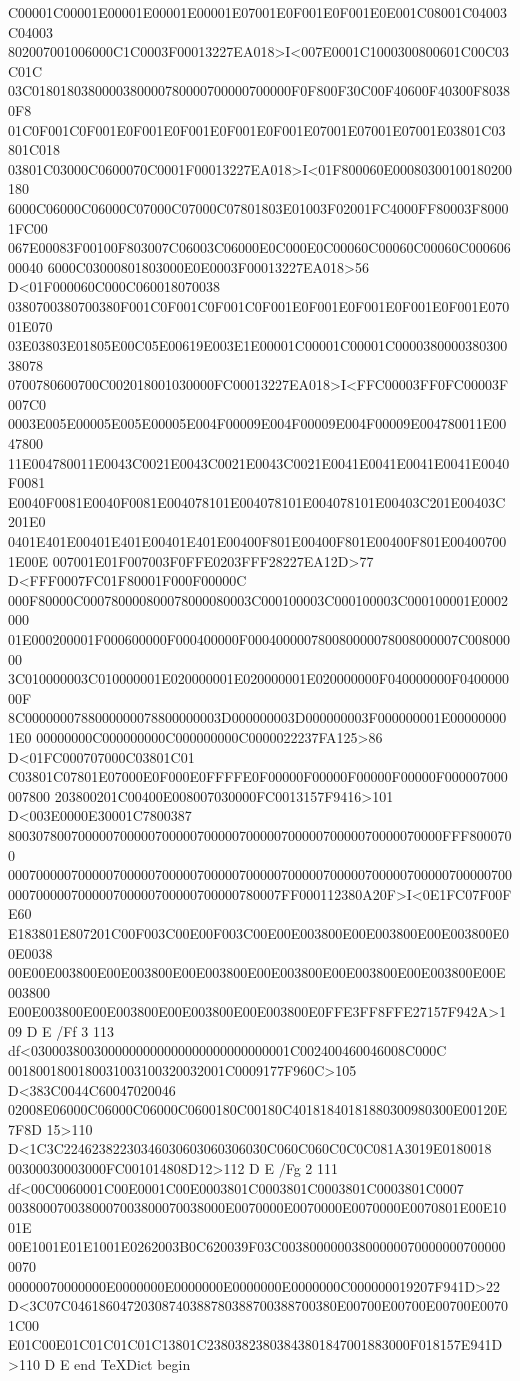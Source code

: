 C00001C00001E00001E00001E00001E07001E0F001E0F001E0E001C08001C04003C04003
802007001006000C1C0003F00013227EA018>I<007E0001C1000300800601C00C03C01C
03C0180180380000380000780000700000700000F0F800F30C00F40600F40300F80380F8
01C0F001C0F001E0F001E0F001E0F001E0F001E07001E07001E07001E03801C03801C018
03801C03000C0600070C0001F00013227EA018>I<01F800060E00080300100180200180
6000C06000C06000C07000C07000C07801803E01003F02001FC4000FF80003F80001FC00
067E00083F00100F803007C06003C06000E0C000E0C00060C00060C00060C00060600040
6000C03000801803000E0E0003F00013227EA018>56 D<01F000060C000C060018070038
0380700380700380F001C0F001C0F001C0F001E0F001E0F001E0F001E0F001E07001E070
03E03803E01805E00C05E00619E003E1E00001C00001C00001C000038000038030038078
0700780600700C002018001030000FC00013227EA018>I<FFC00003FF0FC00003F007C0
0003E005E00005E005E00005E004F00009E004F00009E004F00009E004780011E0047800
11E004780011E0043C0021E0043C0021E0043C0021E0041E0041E0041E0041E0040F0081
E0040F0081E0040F0081E004078101E004078101E004078101E00403C201E00403C201E0
0401E401E00401E401E00401E401E00400F801E00400F801E00400F801E004007001E00E
007001E01F007003F0FFE0203FFF28227EA12D>77 D<FFF0007FC01F80001F000F00000C
000F80000C000780000800078000080003C000100003C000100003C000100001E0002000
01E000200001F000600000F000400000F000400000780080000078008000007C00800000
3C010000003C010000001E020000001E020000001E020000000F040000000F040000000F
8C0000000788000000078800000003D000000003D000000003F000000001E000000001E0
00000000C000000000C000000000C0000022237FA125>86 D<01FC000707000C03801C01
C03801C07801E07000E0F000E0FFFFE0F00000F00000F00000F00000F000007000007800
203800201C00400E008007030000FC0013157F9416>101 D<003E0000E30001C7800387
80030780070000070000070000070000070000070000070000070000070000FFF8000700
000700000700000700000700000700000700000700000700000700000700000700000700
000700000700000700000700000700000780007FF000112380A20F>I<0E1FC07F00FE60
E183801E807201C00F003C00E00F003C00E00E003800E00E003800E00E003800E00E0038
00E00E003800E00E003800E00E003800E00E003800E00E003800E00E003800E00E003800
E00E003800E00E003800E00E003800E00E003800E0FFE3FF8FFE27157F942A>109
D E
/Ff 3 113 df<0300038003000000000000000000000000001C002400460046008C000C
0018001800180031003100320032001C0009177F960C>105 D<383C0044C60047020046
02008E06000C06000C06000C0600180C00180C40181840181880300980300E00120E7F8D
15>110 D<1C3C22462382230346030603060306030C060C060C0C0C081A3019E0180018
00300030003000FC001014808D12>112 D E
/Fg 2 111 df<00C0060001C00E0001C00E0003801C0003801C0003801C0003801C0007
0038000700380007003800070038000E0070000E0070000E0070000E0070801E00E1001E
00E1001E01E1001E0262003B0C620039F03C003800000038000000700000007000000070
00000070000000E0000000E0000000E0000000E0000000C000000019207F941D>22
D<3C07C04618604720308740388780388700388700380E00700E00700E00700E00701C00
E01C00E01C01C01C01C13801C23803823803843801847001883000F018157E941D>110
D E
end
TeXDict begin

